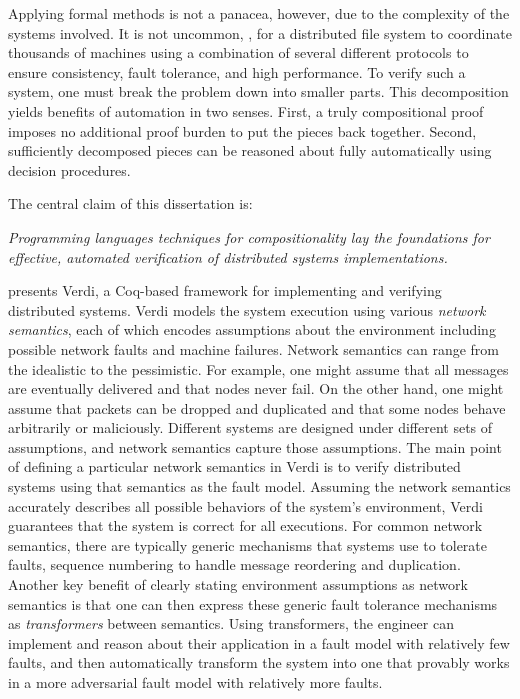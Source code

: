 Applying formal methods is not a panacea, however, due to the
complexity of the systems involved.  It is not uncommon, \eg, for a
distributed file system to coordinate thousands of machines using a
combination of several different protocols to ensure consistency,
fault tolerance, and high performance.  To verify such a
system, one must break the problem down into smaller parts.
This decomposition yields benefits of automation in two senses.
First, a truly compositional proof imposes no additional proof
burden to put the pieces back together. Second, sufficiently
decomposed pieces can be reasoned about fully automatically
using decision procedures. 

The central claim of this dissertation is:
\begin{center}
\emph{Programming languages techniques for compositionality
  lay the foundations for effective, automated verification of
  distributed systems implementations.
}
\end{center}

 presents Verdi, a Coq-based framework for implementing and
verifying distributed systems.  Verdi models the system execution
using various \emph{network semantics}, each of which encodes
assumptions about the environment including possible network faults
and machine failures.  Network semantics can range from the idealistic
to the pessimistic. For example, one might assume that all messages
are eventually delivered and that nodes never fail. On the other hand,
one might assume that packets can be dropped and duplicated and that
some nodes behave arbitrarily or maliciously. Different systems are
designed under different sets of assumptions, and network semantics
capture those assumptions.
The main point of defining a particular network semantics in Verdi is to verify
distributed systems using that semantics as the fault model.
Assuming the network semantics
accurately describes all possible behaviors of the system's
environment, Verdi guarantees that the system is correct for all executions.
For common network semantics, there are typically generic mechanisms
that systems use to tolerate faults, \eg sequence numbering to handle
message reordering and duplication. Another key benefit of clearly
stating environment assumptions as network semantics is that one
can then express these generic fault tolerance mechanisms as \emph{transformers}
between semantics.
Using transformers, the engineer can implement and reason about their
application in a fault model
with relatively few faults, and then automatically transform the system
into one that provably works in a more adversarial fault model with
relatively more faults. 

